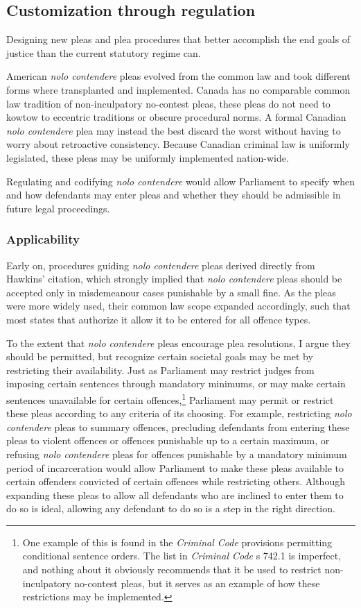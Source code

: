 \subsection{Customization through regulation}

Designing new pleas and plea procedures that better accomplish the end goals of justice than the current statutory regime can.

American \textit{nolo contendere} pleas evolved from the common law and took different forms where transplanted and implemented. Canada has no comparable common law tradition of non-inculpatory no-contest pleas, these pleas do not need to kowtow to eccentric traditions or obscure procedural norms. A formal Canadian \textit{nolo contendere} plea may instead the best discard the worst without having to worry about retroactive consistency. Because Canadian criminal law is uniformly legislated, these pleas may be uniformly implemented nation-wide. 

Regulating and codifying \textit{nolo contendere} would allow Parliament to specify when and how defendants may enter pleas and whether they should be admissible in future legal proceedings.

\subsubsection{Applicability}

Early on, procedures guiding \textit{nolo contendere} pleas derived directly from Hawkins' citation, which strongly implied that \textit{nolo contendere} pleas should be accepted only in misdemeanour cases punishable by a small fine. As the pleas were more widely used, their common law scope expanded accordingly, such that most states that authorize it allow it to be entered for all offence types.

To the extent that \textit{nolo contendere} pleas encourage plea resolutions, I argue they should be permitted, but recognize certain societal goals may be met by restricting their availability. Just as Parliament may restrict judges from imposing certain sentences through mandatory minimums, or may make certain sentences unavailable for certain offences,\footnote{One example of this is found in the \textit{Criminal Code} provisions permitting conditional sentence orders. The list in \textit{Criminal Code} s 742.1 is imperfect, and nothing about it obviously recommends that it be used to restrict non-inculpatory no-contest pleas, but it serves as an example of how these restrictions may be implemented.} Parliament may permit or restrict these pleas according to any criteria of its choosing. For example, restricting \textit{nolo contendere} pleas to summary offences, precluding defendants from entering these pleas to violent offences or offences punishable up to a certain maximum, or refusing \textit{nolo contendere} pleas for offences punishable by a mandatory minimum period of incarceration would allow Parliament to make these pleas available to certain offenders convicted of certain offences while restricting others. Although expanding these pleas to allow all defendants who are inclined to enter them to do so is ideal, allowing any defendant to do so is a step in the right direction.

